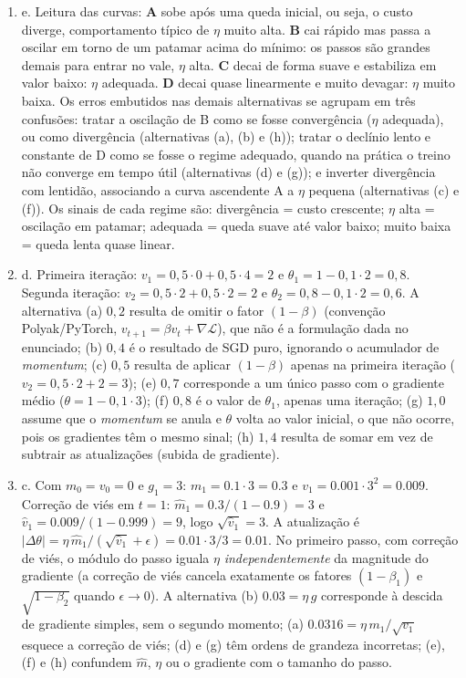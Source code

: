 \documentclass{dlproblemset}
\begin{document}
\begin{enumerate}[1)]
    \item e. Leitura das curvas: \textbf{A} sobe após uma queda inicial, ou seja, o custo diverge, comportamento típico de $\eta$ muito alta. \textbf{B} cai rápido mas passa a oscilar em torno de um patamar acima do mínimo: os passos são grandes demais para entrar no vale, $\eta$ alta. \textbf{C} decai de forma suave e estabiliza em valor baixo: $\eta$ adequada. \textbf{D} decai quase linearmente e muito devagar: $\eta$ muito baixa. Os erros embutidos nas demais alternativas se agrupam em três confusões: tratar a oscilação de B como se fosse convergência ($\eta$ adequada), ou como divergência (alternativas (a), (b) e (h)); tratar o declínio lento e constante de D como se fosse o regime adequado, quando na prática o treino não converge em tempo útil (alternativas (d) e (g)); e inverter divergência com lentidão, associando a curva ascendente A a $\eta$ pequena (alternativas (c) e (f)). Os sinais de cada regime são: divergência = custo crescente; $\eta$ alta = oscilação em patamar; adequada = queda suave até valor baixo; muito baixa = queda lenta quase linear.

    \item d. Primeira iteração: $v_1 = 0{,}5 \cdot 0 + 0{,}5 \cdot 4 = 2$ e $\theta_1 = 1 - 0{,}1 \cdot 2 = 0{,}8$. Segunda iteração: $v_2 = 0{,}5 \cdot 2 + 0{,}5 \cdot 2 = 2$ e $\theta_2 = 0{,}8 - 0{,}1 \cdot 2 = 0{,}6$. A alternativa (a) $0{,}2$ resulta de omitir o fator $(1-\beta)$ (convenção Polyak/PyTorch, $v_{t+1} = \beta v_t + \nabla\mathcal{L}$), que não é a formulação dada no enunciado; (b) $0{,}4$ é o resultado de SGD puro, ignorando o acumulador de \textit{momentum}; (c) $0{,}5$ resulta de aplicar $(1-\beta)$ apenas na primeira iteração ($v_2 = 0{,}5\cdot 2 + 2 = 3$); (e) $0{,}7$ corresponde a um único passo com o gradiente médio ($\theta = 1 - 0{,}1 \cdot 3$); (f) $0{,}8$ é o valor de $\theta_1$, apenas uma iteração; (g) $1{,}0$ assume que o \textit{momentum} se anula e $\theta$ volta ao valor inicial, o que não ocorre, pois os gradientes têm o mesmo sinal; (h) $1{,}4$ resulta de somar em vez de subtrair as atualizações (subida de gradiente).

    \item c. Com $m_0 = v_0 = 0$ e $g_1 = 3$: $m_1 = 0.1\cdot 3 = 0.3$ e $v_1 = 0.001\cdot 3^2 = 0.009$. Correção de viés em $t = 1$: $\hat{m}_1 = 0.3/(1-0.9) = 3$ e $\hat{v}_1 = 0.009/(1-0.999) = 9$, logo $\sqrt{\hat{v}_1} = 3$. A atualização é $|\Delta\theta| = \eta\,\hat{m}_1/(\sqrt{\hat{v}_1} + \epsilon) = 0.01\cdot 3/3 = 0.01$. No primeiro passo, com correção de viés, o módulo do passo iguala $\eta$ \emph{independentemente} da magnitude do gradiente (a correção de viés cancela exatamente os fatores $(1-\beta_1)$ e $\sqrt{1-\beta_2}$ quando $\epsilon \to 0$). A alternativa (b) $0.03 = \eta\,g$ corresponde à descida de gradiente simples, sem o segundo momento; (a) $0.0316 = \eta\,m_1/\sqrt{v_1}$ esquece a correção de viés; (d) e (g) têm ordens de grandeza incorretas; (e), (f) e (h) confundem $\hat{m}$, $\eta$ ou o gradiente com o tamanho do passo.


\end{enumerate}
\end{document}
